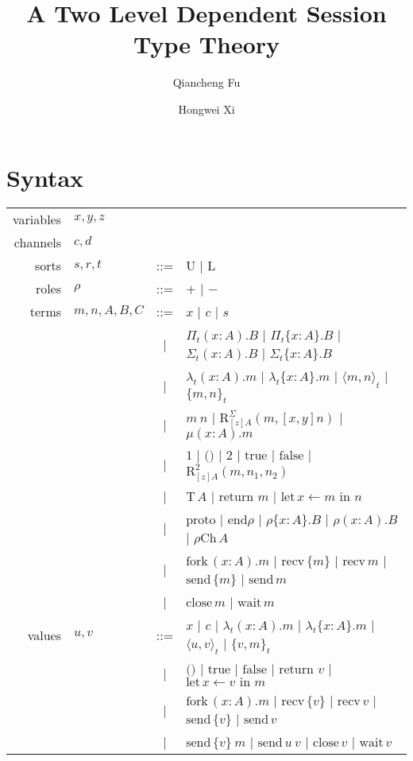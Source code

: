 \documentclass{article}
\title{A Two Level Dependent Session Type Theory}
\author[1]{Qiancheng Fu}
\author[1]{Hongwei Xi}
\affil[1]{Boston University}
\newcommand{\Un}{\text{U}}
\newcommand{\Ln}{\text{L}}
\newcommand{\PiR}[3]{\Pi_{#1}({#2}).{#3}}
\newcommand{\PiI}[3]{\Pi_{#1}\{{#2}\}.{#3}}
\newcommand{\lamR}[3]{\lambda_{#1}({#2}).{#3}}
\newcommand{\lamI}[3]{\lambda_{#1}\{{#2}\}.{#3}}
\newcommand{\SigR}[3]{\Sigma_{#1}({#2}).{#3}}
\newcommand{\SigI}[3]{\Sigma_{#1}\{{#2}\}.{#3}}
\newcommand{\pairR}[3]{\langle{{#1},{#2}}\rangle_{#3}}
\newcommand{\pairI}[3]{\{{#1},{#2}\}_{#3}}
\newcommand{\SigElim}[3]{\text{R}_{#1}^{\Sigma}({#2},{#3})}
\newcommand{\fix}[2]{\mu({#1}).{#2}}
\newcommand{\unit}{\text{1}}
\newcommand{\ii}{\text{()}}
\newcommand{\bool}{\text{2}}
\newcommand{\btrue}{\text{true}}
\newcommand{\bfalse}{\text{false}}
\newcommand{\boolElim}[4]{\text{R}_{#1}^{\bool}({#2},{#3},{#4})}
\newcommand{\T}[1]{\text{T}\,{#1}}
\newcommand{\return}[1]{\text{return }{#1}}
\newcommand{\letin}[3]{\text{let}\,{#1}\leftarrow{#2}\text{ in }{#3}}
\newcommand{\proto}{\text{proto}}
\newcommand{\protoEnd}[1]{\text{end}{#1}}
\newcommand{\actI}[3]{{#1}\{{#2}\}.{#3}}
\newcommand{\actR}[3]{{#1}({#2}).{#3}}
\newcommand{\Ch}[2]{{#1}\text{Ch}\,{#2}}
\newcommand{\fork}[2]{\text{fork}\,({#1}).{#2}}
\newcommand{\recvI}[1]{\text{recv}\,\{{#1}\}}
\newcommand{\recvR}[1]{\text{recv}\,{#1}}
\newcommand{\sendI}[1]{\text{send}\,\{{#1}\}}
\newcommand{\sendR}[1]{\text{send}\,{#1}}
\newcommand{\close}[1]{\text{close}\,{#1}}
\newcommand{\wait}[1]{\text{wait}\,{#1}}
\begin{document}
\maketitle

\section{Syntax}
\begin{center}
  \begin{tabular}{r l c l}
    variables & $x, y, z$   &     &               \\
    channels  & $c, d$      &     &               \\
    sorts     & $s, r, t$   & ::= & $\Un$ | $\Ln$ \\
    roles     & $\rho$      & ::= & $+$ | $-$ \\
    terms     & $m,n,A,B,C$ & ::= & $x$ | $c$ | $s$ \\
              &             & \;| & $\PiR{t}{x : A}{B}$ | $\PiI{t}{x : A}{B}$
                                    | $\SigR{t}{x : A}{B}$ | $\SigI{t}{x : A}{B}$ \\
              &             & \;| & $\lamR{t}{x : A}{m}$ | $\lamI{t}{x : A}{m}$
                                    | $\pairR{m}{n}{t}$ | $\pairI{m}{n}{t}$ \\
              &             & \;| & $m\ n$ | $\SigElim{[z]A}{m}{[x,y]n}$ | $\fix{x : A}{m}$ \\
              &             & \;| & $\unit$ | $\ii$ | $\bool$ | $\btrue$ | $\bfalse$
                                    | $\boolElim{[z]A}{m}{n_{1}}{n_{2}}$ \\
              &             & \;| & $\T{A}$ | $\return{m}$ | $\letin{x}{m}{n}$ \\
              &             & \;| & $\proto$ | $\protoEnd{\rho}$
                                    | $\actI{\rho}{x : A}{B}$ | $\actR{\rho}{x : A}{B}$ | $\Ch{\rho}{A}$ \\
              &             & \;| & $\fork{x : A}{m}$ | $\recvI{m}$ | $\recvR{m}$
                                    | $\sendI{m}$ | $\sendR{m}$ \\
              &             & \;| & $\close{m}$ | $\wait{m}$ \\
    values    & $u, v$      & ::= & $x$ | $c$ | $\lamR{t}{x : A}{m}$ | $\lamI{t}{x : A}{m}$
                                    | $\pairR{u}{v}{t}$ | $\pairI{v}{m}{t}$ \\
              &             & \;| & $\ii$ | $\btrue$ | $\bfalse$ | $\return{v}$ | $\letin{x}{v}{m}$ \\
              &             & \;| & $\fork{x : A}{m}$ | $\recvI{v}$ | $\recvR{v}$ | $\sendI{v}$ | $\sendR{v}$ \\
              &             & \;| & $\sendI{v}\ m$ | $\sendR{u}\ v$ | $\close{v}$ | $\wait{v}$
  \end{tabular}
\end{center}
\end{document}
